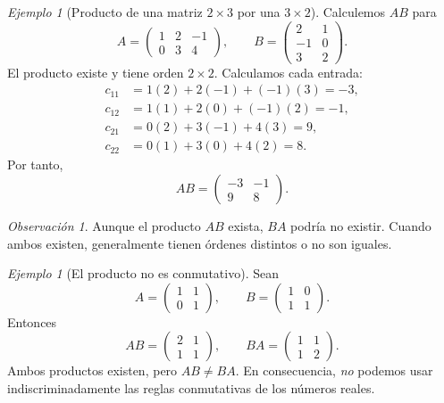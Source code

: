 \documentclass[12pt]{article}
\theoremstyle{remark}
\newtheorem{observacion}[definicion]{Observación}
\newtheorem{ejemplo}[definicion]{Ejemplo}
\begin{document}
\begin{ejemplo}[Producto de una matriz $2\times3$ por una $3\times2$]
Calculemos $AB$ para
\[
A=\begin{pmatrix}1&2&-1\\0&3&4\end{pmatrix},\qquad
B=\begin{pmatrix}2&1\\-1&0\\3&2\end{pmatrix}.
\]
El producto existe y tiene orden $2\times2$. Calculamos cada entrada:
\begin{align*}
c_{11}&=1(2)+2(-1)+(-1)(3)=-3,\\
c_{12}&=1(1)+2(0)+(-1)(2)=-1,\\
c_{21}&=0(2)+3(-1)+4(3)=9,\\
c_{22}&=0(1)+3(0)+4(2)=8.
\end{align*}
Por tanto,
\[\boxed{AB=\begin{pmatrix}-3&-1\\9&8\end{pmatrix}.}\]
\end{ejemplo}

\begin{observacion}
Aunque el producto $AB$ exista, $BA$ podría no existir. Cuando ambos existen, generalmente tienen órdenes distintos o no son iguales.
\end{observacion}

\begin{ejemplo}[El producto no es conmutativo]
Sean
\[
A=\begin{pmatrix}1&1\\0&1\end{pmatrix},\qquad
B=\begin{pmatrix}1&0\\1&1\end{pmatrix}.
\]
Entonces
\[
AB=\begin{pmatrix}2&1\\1&1\end{pmatrix},\qquad
BA=\begin{pmatrix}1&1\\1&2\end{pmatrix}.
\]
Ambos productos existen, pero $AB\ne BA$. En consecuencia, \emph{no} podemos usar indiscriminadamente las reglas conmutativas de los números reales.
\end{ejemplo}
\end{document}
